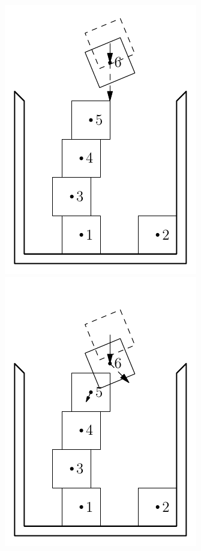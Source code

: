 \documentclass[12pt, sumlimits, intlimits]{article}
\begin{document}
\begin{figure}
\includegraphics[width=\w]{dem-2}%
\includegraphics[width=\w]{dem-3} \\

\end{figure}
\end{document}
